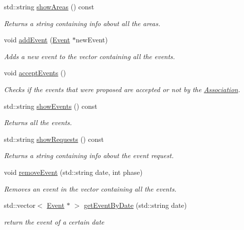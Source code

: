 \begin{DoxyCompactItemize}
std\+::string \mbox{\hyperlink{classAssociation_a149a29d7d7b59d15dadd84a2289c87e4}{show\+Areas}} () const
\begin{DoxyCompactList}\small\item\em Returns a string containing info about all the areas. \end{DoxyCompactList}\item 
void \mbox{\hyperlink{classAssociation_a047b29b0d39da0695de0200ad495dee1}{add\+Event}} (\mbox{\hyperlink{classEvent}{Event}} $\ast$new\+Event)
\begin{DoxyCompactList}\small\item\em Adds a new event to the vector containing all the events. \end{DoxyCompactList}\item 
void \mbox{\hyperlink{classAssociation_a944406d8918729d1b9f0c7b5e34997d2}{accept\+Events}} ()
\begin{DoxyCompactList}\small\item\em Checks if the events that were proposed are accepted or not by the \mbox{\hyperlink{classAssociation}{Association}}. \end{DoxyCompactList}\item 
std\+::string \mbox{\hyperlink{classAssociation_aff3817596c302056ca73ca6a98e7bf3c}{show\+Events}} () const
\begin{DoxyCompactList}\small\item\em Returns all the events. \end{DoxyCompactList}\item 
std\+::string \mbox{\hyperlink{classAssociation_a7d743e480f5dbba9189a40d17b931121}{show\+Requests}} () const
\begin{DoxyCompactList}\small\item\em Returns a string containing info about the event request. \end{DoxyCompactList}\item 
void \mbox{\hyperlink{classAssociation_a672445f247a9bab36b87e770f4b0f512}{remove\+Event}} (std\+::string date, int phase)
\begin{DoxyCompactList}\small\item\em Removes an event in the vector containing all the events. \end{DoxyCompactList}\item 
std\+::vector$<$ \mbox{\hyperlink{classEvent}{Event}} $\ast$ $>$ \mbox{\hyperlink{classAssociation_af5a5354a9e84e8441f0bda694966d834}{get\+Event\+By\+Date}} (std\+::string date)
\begin{DoxyCompactList}\small\item\em return the event of a certain date \end{DoxyCompactList}\item 

\end{DoxyCompactItemize}
